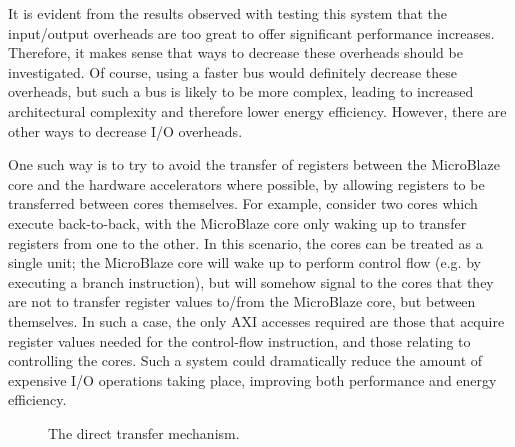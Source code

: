 \documentclass{UoYCSproject}
\begin{document}
It is evident from the results observed with testing this system that the input/output overheads are too great to
offer significant performance increases. Therefore, it makes sense that ways to decrease these overheads should be investigated.
Of course, using a faster bus would definitely decrease these overheads, but such a bus is likely to be more complex, leading
to increased architectural complexity and therefore lower energy efficiency. However, there are other ways to decrease
I/O overheads.

One such way is to try to avoid the transfer of registers between the MicroBlaze core and the hardware accelerators where
possible, by allowing registers to be transferred between cores themselves. For example, consider two cores which
execute back-to-back, with the MicroBlaze core only waking up to transfer registers from one to the other. In this scenario,
the cores can be treated as a single unit; the MicroBlaze core will wake up to perform control flow (e.g. by executing a branch
instruction), but will somehow signal to the cores that they are not to transfer register values to/from the MicroBlaze core,
but between themselves. In such a case, the only AXI accesses required are those that acquire register values needed for the
control-flow instruction, and those relating to controlling the cores. Such a system could dramatically reduce the amount
of expensive I/O operations taking place, improving both performance and energy efficiency.

\begin{figure}[H]
\caption{The direct transfer mechanism.}
\label{fig:directTransfer}
\end{figure}
\end{document}
